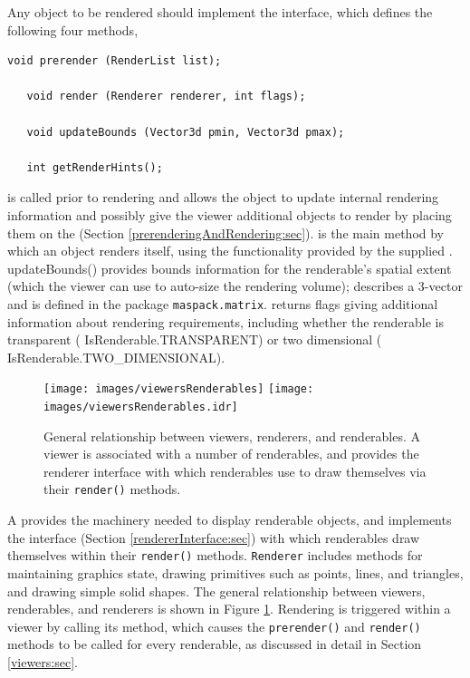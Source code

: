 Any object to be rendered should implement the
 interface, which defines the
following four methods,
%
\begin{lstlisting}[]
   void prerender (RenderList list);

   void render (Renderer renderer, int flags);

   void updateBounds (Vector3d pmin, Vector3d pmax);

   int getRenderHints();
\end{lstlisting}
%
is called prior to rendering and allows the object to update internal
rendering information and possibly give the viewer additional objects
to render by placing them on the
 (Section
\ref{prerenderingAndRendering:sec}).
 is the
main method by which an object renders itself, using the functionality
provided by the supplied .
%
{updateBounds()} provides bounds information for the renderable's
spatial extent (which the viewer can use to auto-size the rendering
volume);  describes a 3-vector and
is defined in the package {\tt maspack.matrix}.
 returns
flags giving additional information about rendering requirements,
including whether the renderable is transparent
(%
{IsRenderable.TRANSPARENT}) or two dimensional
(%
{IsRenderable.TWO\_DIMENSIONAL}).
%
\begin{figure}[t]
\begin{center}
\iflatexml
 \texttt{[image: images/viewersRenderables]}
\else
 \texttt{[image: images/viewersRenderables.idr]}
\fi
\end{center}
\caption{General relationship between viewers, renderers, and
renderables. A viewer is associated with a number of renderables, and
provides the renderer interface with which renderables use to draw
themselves via their {\tt render()} methods.}
\label{viewersRenderables:fig}
\end{figure}
%

A  provides the machinery needed to
display renderable objects, and implements the
 interface (Section
\ref{rendererInterface:sec}) with which renderables draw themselves
within their {\tt render()} methods.  {\tt Renderer} includes
methods for maintaining graphics state, drawing primitives such as
points, lines, and triangles, and drawing simple solid shapes.  The
general relationship between viewers, renderables, and renderers is
shown in Figure \ref{viewersRenderables:fig}.  Rendering is triggered
within a viewer by calling its
 method, which causes
the {\tt prerender()} and {\tt render()} methods to be called for
every renderable, as discussed in detail in Section \ref{viewers:sec}.


